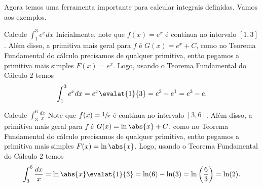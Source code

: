 Agora temos uma ferramenta importante para calcular integrais definidas.
Vamos aos exemplos.
\begin{example}
  Calcule \(\int_1^3 e^x dx\)
  \solution
  Inicialmente, note que $f(x)=e^x$ é contínua no intervalo $[1, 3]$. Além
  disso, a primitiva mais geral para $f$ é $G(x)=e^x+ C$, como no Teorema
  Fundamental do cálculo precisamos de qualquer primitiva, então pegamos a
  primitiva mais simples $F(x)=e^x$. Logo, usando o Teorema Fundamental do
  Cálculo 2 temos
  \[
    \int_1^3 e^x dx
    = e^x \evalat{1}{3}
    = e^3-e^1
    = e^3 - e.
  \]
\end{example}

\begin{example}
  Calcule \(\int_3^6 \frac{dx}{x}\)
  \solution
  Note que $f(x)=\sfrac{1}{x}$ é contínua no intervalo $[3, 6]$. Além disso, a
  primitiva mais geral para $f$ é $G(x)=\ln\abs{x}+ C$, como no Teorema Fundamental
  do cálculo precisamos de qualquer primitiva, então pegamos a primitiva mais
  simples $F(x)=\ln\abs{x}$. Logo, usando o Teorema Fundamental do Cálculo 2 temos
  \[
    \int_3^6 \frac{dx}{x}
    = \ln\abs{x} \evalat{1}{3}
    = \ln(6) - \ln(3)
    = \ln\left(\frac{6}{3}\right)
    = \ln(2).
  \]
\end{example}

